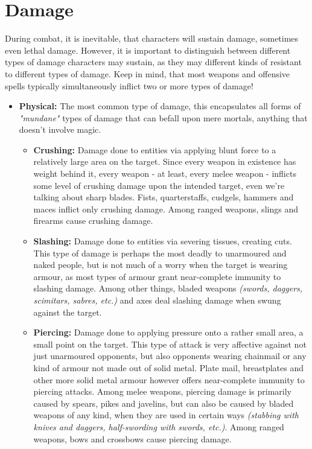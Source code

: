 \documentclass[openany,11pt,a4paper]{book}
\begin{document}
\section{Damage}
During combat, it is inevitable, that characters will sustain damage, sometimes even lethal damage. However, it is important to distinguish between different types of damage characters may sustain, as they may different kinds of resistant to different types of damage. Keep in mind, that most weapons and offensive spells typically simultaneously inflict two or more types of damage!
\begin{itemize}
\item \textbf{Physical:} The most common type of damage, this encapsulates all forms of \textit{"mundane"} types of damage that can befall upon mere mortals, anything that doesn't involve magic.
	\begin{itemize}[label=$\star$]
		\item \textbf{Crushing:} Damage done to entities via applying blunt force to a relatively large area on the target. Since every weapon in existence has weight behind it, every weapon - at least, every melee weapon - inflicts some level of crushing damage upon the intended target, even we're talking about sharp blades. Fists, quarterstaffs, cudgels, hammers and maces inflict only crushing damage. Among ranged weapons, slings and firearms cause crushing damage.
		\item \textbf{Slashing:} Damage done to entities via severing tissues, creating cuts. This type of damage is perhaps the most deadly to unarmoured and naked people, but is not much of a worry when the target is wearing armour, as most types of armour grant near-complete immunity to slashing damage. Among other things, bladed weapons \textit{(swords, daggers, scimitars, sabres, etc.)} and axes deal slashing damage when swung against the target.
		\item \textbf{Piercing:} Damage done to applying pressure onto a rather small area, a small point on the target. This type of attack is very affective against not just unarmoured opponents, but also opponents wearing chainmail or any kind of armour not made out of solid metal. Plate mail, breastplates and other more solid metal armour however offers near-complete immunity to piercing attacks. Among melee weapons, piercing damage is primarily caused by spears, pikes and javelins, but can also be caused by bladed weapons of any kind, when they are used in certain ways \textit{(stabbing with knives and daggers, half-swording with swords, etc.)}. Among ranged weapons, bows and crossbows cause piercing damage.

\end{itemize}
\end{itemize}
\end{document}
